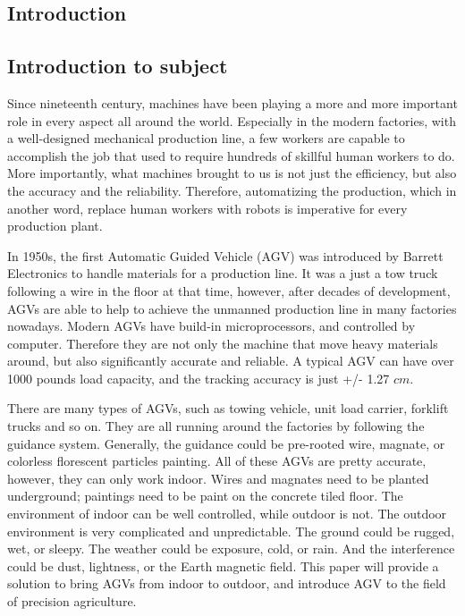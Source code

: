 \documentclass[12pt]{article}
\begin{document}
\begin{flushleft}

\section{Introduction}

\subsection{Introduction to subject}

Since nineteenth century, machines have been playing a more and more important role in every aspect all around the world. Especially in the modern factories, with a well-designed mechanical production line, a few workers are capable to accomplish the job that used to require hundreds of skillful human workers to do. %
More importantly, what machines brought to us is not just the efficiency, but also the accuracy and the reliability. Therefore, automatizing the production, which in another word, replace human workers with robots is imperative for every production plant. 

In 1950s, the first Automatic Guided Vehicle (AGV) was introduced by Barrett Electronics to handle materials for a production line. \cite{olmi2011traffic} It was a just a tow truck following a wire in the floor at that time, however, after decades of development, AGVs are able to help to achieve the unmanned production line in many factories nowadays. Modern AGVs have build-in microprocessors, and controlled by computer. Therefore they are not only the machine that move heavy materials around, but also significantly accurate and reliable. A typical AGV can have over 1000 pounds load capacity, and the tracking accuracy is just +/- 1.27 $cm$. \cite{KESH} 

There are many types of AGVs, such as towing vehicle, unit load carrier, forklift trucks and so on. They are all running around the factories by following the guidance system. Generally, the guidance could be pre-rooted wire, magnate, or colorless florescent particles painting. All of these AGVs are pretty accurate, however, they can only work indoor. Wires and magnates need to be planted underground; paintings need to be paint on the concrete tiled floor. The environment of indoor can be well controlled, while outdoor is not. The outdoor environment is very complicated and unpredictable. The ground could be rugged, wet, or sleepy. The weather could be exposure, cold, or rain. And the interference could be dust, lightness, or the Earth magnetic field. This paper will provide a solution to bring AGVs from indoor to outdoor, and introduce AGV to the field of precision agriculture.


\end{flushleft}
\end{document}
